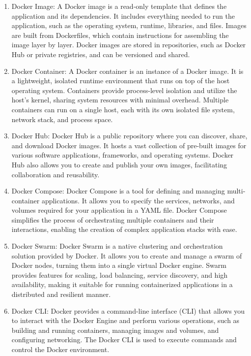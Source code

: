 \begin{enumerate}
    \item Docker Image: A Docker image is a read-only template that defines the application and its dependencies. It includes everything needed to run the application, such as the operating system, runtime, libraries, and files. Images are built from Dockerfiles, which contain instructions for assembling the image layer by layer. Docker images are stored in repositories, such as Docker Hub or private registries, and can be versioned and shared.

    \item Docker Container: A Docker container is an instance of a Docker image. It is a lightweight, isolated runtime environment that runs on top of the host operating system. Containers provide process-level isolation and utilize the host's kernel, sharing system resources with minimal overhead. Multiple containers can run on a single host, each with its own isolated file system, network stack, and process space.

    \item Docker Hub: Docker Hub is a public repository where you can discover, share, and download Docker images. It hosts a vast collection of pre-built images for various software applications, frameworks, and operating systems. Docker Hub also allows you to create and publish your own images, facilitating collaboration and reusability.

    \item Docker Compose: Docker Compose is a tool for defining and managing multi-container applications. It allows you to specify the services, networks, and volumes required for your application in a YAML file. Docker Compose simplifies the process of orchestrating multiple containers and their interactions, enabling the creation of complex application stacks with ease.

    \item Docker Swarm: Docker Swarm is a native clustering and orchestration solution provided by Docker. It allows you to create and manage a swarm of Docker nodes, turning them into a single virtual Docker engine. Swarm provides features for scaling, load balancing, service discovery, and high availability, making it suitable for running containerized applications in a distributed and resilient manner.

    \item Docker CLI: Docker provides a command-line interface (CLI) that allows you to interact with the Docker Engine and perform various operations, such as building and running containers, managing images and volumes, and configuring networking. The Docker CLI is used to execute commands and control the Docker environment.

\end{enumerate}

